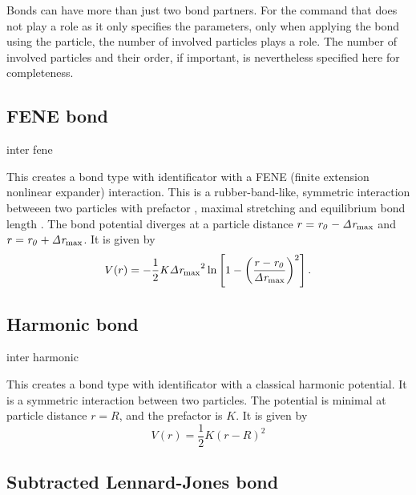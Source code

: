 Bonds can have more than just two bond partners. For the  command
that does not play a role as it only specifies the parameters, only when
applying the bond using the  particle, the number of involved
particles plays a role. The number of involved particles and their order, if
important, is nevertheless specified here for completeness.

\subsection{FENE bond}

\begin{essyntax}
  inter 
  fene
    
\end{essyntax}
This creates a bond type with identificator  with a
FENE (finite extension nonlinear expander) interaction. This is a
rubber-band-like, symmetric interaction betweeen two particles with
prefactor , maximal stretching  and
equilibrium bond length .  The bond potential diverges at a
particle distance $r=\mathrm{\mathit{r_0}}-\mathrm{\mathit{\Delta r_\mathrm{max}}}$ and
$r=\mathrm{\mathit{r_0}}+\mathrm{\mathit{\Delta r_\mathrm{max}}}$. It is given by
\begin{equation}
  V(r) = -\frac{1}{2} \mathrm{\mathit{K}} \mathrm{\mathit{\Delta r_\mathrm{max}}}^2\ln \left[ 1 - \left(
      \frac{r-\mathrm{\mathit{r_0}}}{\mathrm{\mathit{\Delta r_\mathrm{max}}}} \right)^2 \right].
\end{equation}

\subsection{Harmonic bond}

\begin{essyntax}
  inter 
  harmonic  
\end{essyntax}
This creates a bond type with identificator  with a
classical harmonic potential. It is a symmetric interaction between two
particles. The potential is minimal at particle distance $r=R$, and the
prefactor is $K$. It is given by
\begin{equation}
  V(r) = \frac{1}{2} K \left( r - R \right)^2
\end{equation}

\subsection{Subtracted Lennard-Jones bond}

